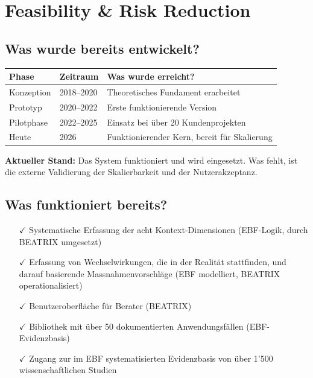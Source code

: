 \documentclass[11pt,a4paper]{article}
\begin{document}
\newpage


\section{Feasibility \& Risk Reduction}

\subsection{Was wurde bereits entwickelt?}

\begin{table}[h]
\centering
\begin{tabular}{@{}L{3cm}L{3cm}L{7cm}@{}}
\toprule
\textbf{Phase} & \textbf{Zeitraum} & \textbf{Was wurde erreicht?} \\
\midrule
Konzeption & 2018--2020 & Theoretisches Fundament erarbeitet \\
Prototyp & 2020--2022 & Erste funktionierende Version \\
Pilotphase & 2022--2025 & Einsatz bei über 20 Kundenprojekten \\
Heute & 2026 & Funktionierender Kern, bereit für Skalierung \\
\bottomrule
\end{tabular}
\end{table}

\textbf{Aktueller Stand:} Das System funktioniert und wird eingesetzt. Was fehlt, ist die externe Validierung der Skalierbarkeit und der Nutzerakzeptanz.

\subsection{Was funktioniert bereits?}

\begin{itemize}
    \item[$\checkmark$] Systematische Erfassung der acht Kontext-Dimensionen (EBF-Logik, durch BEATRIX umgesetzt)
    \item[$\checkmark$] Erfassung von Wechselwirkungen, die in der Realität stattfinden, und darauf basierende Massnahmenvorschläge (EBF modelliert, BEATRIX operationalisiert)
    \item[$\checkmark$] Benutzeroberfläche für Berater (BEATRIX)
    \item[$\checkmark$] Bibliothek mit über 50 dokumentierten Anwendungsfällen (EBF-Evidenzbasis)
    \item[$\checkmark$] Zugang zur im EBF systematisierten Evidenzbasis von über 1'500 wissenschaftlichen Studien
\end{itemize}
\end{document}
